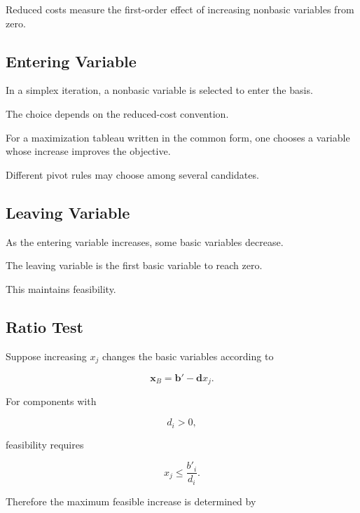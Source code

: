 Reduced costs measure the first-order effect of increasing nonbasic
variables from zero.

\subsection{Entering Variable}
\label{subsec:simplex-entering-variable}

In a simplex iteration, a nonbasic variable is selected to enter the
basis.

The choice depends on the reduced-cost convention.

For a maximization tableau written in the common form, one chooses a
variable whose increase improves the objective.

Different pivot rules may choose among several candidates.

\subsection{Leaving Variable}
\label{subsec:simplex-leaving-variable}

As the entering variable increases, some basic variables decrease.

The leaving variable is the first basic variable to reach zero.

This maintains feasibility.

\subsection{Ratio Test}
\label{subsec:simplex-ratio-test}

Suppose increasing \(x_j\) changes the basic variables according to

\[
\mathbf{x}_B
=
\mathbf{b}'
-
\mathbf{d}x_j.
\]

For components with

\[
d_i>0,
\]

feasibility requires

\[
x_j
\leq
\frac{
b'_i
}{
d_i
}.
\]

Therefore the maximum feasible increase is determined by

